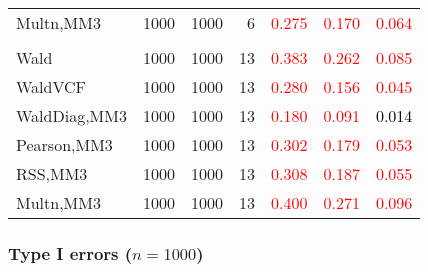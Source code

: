 \documentclass[
]{article}
\begin{document}
\begin{table}[H]
{\begin{tabular}[t]{lrrrrrr}
\hspace{1em}Multn,MM3 & 1000 & 1000 & 6 & \textcolor{red}{0.275} & \textcolor{red}{0.170} & \textcolor{red}{0.064}\\
\addlinespace[0.3em]
\multicolumn{7}{l}{\textbf{3F 15V}}\\
\hspace{1em}Wald & 1000 & 1000 & 13 & \textcolor{red}{0.383} & \textcolor{red}{0.262} & \textcolor{red}{0.085}\\
\hspace{1em}WaldVCF & 1000 & 1000 & 13 & \textcolor{red}{0.280} & \textcolor{red}{0.156} & \textcolor{red}{0.045}\\
\hspace{1em}WaldDiag,MM3 & 1000 & 1000 & 13 & \textcolor{red}{0.180} & \textcolor{red}{0.091} & \textcolor{black}{0.014}\\
\hspace{1em}Pearson,MM3 & 1000 & 1000 & 13 & \textcolor{red}{0.302} & \textcolor{red}{0.179} & \textcolor{red}{0.053}\\
\hspace{1em}RSS,MM3 & 1000 & 1000 & 13 & \textcolor{red}{0.308} & \textcolor{red}{0.187} & \textcolor{red}{0.055}\\
\hspace{1em}Multn,MM3 & 1000 & 1000 & 13 & \textcolor{red}{0.400} & \textcolor{red}{0.271} & \textcolor{red}{0.096}\\
\bottomrule
\end{tabular}}
\endgroup{}
\end{table}

\hypertarget{type-i-errors-n1000-1}{%
\subsubsection{\texorpdfstring{Type I errors
(\(n=1000\))}{Type I errors (n=1000)}}\label{type-i-errors-n1000-1}}
\end{document}
